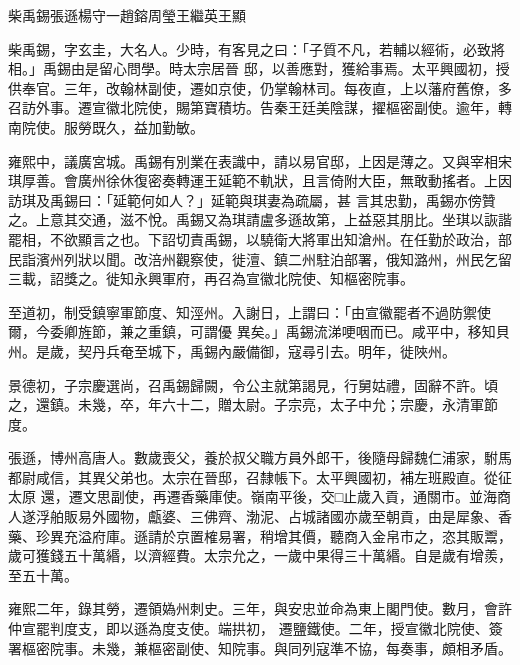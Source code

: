 
\begin{pinyinscope}

 柴禹錫張遜楊守一趙鎔周瑩王繼英王顯



 柴禹錫，字玄圭，大名人。少時，有客見之曰：「子質不凡，若輔以經術，必致將相。」禹錫由是留心問學。時太宗居晉
 邸，以善應對，獲給事焉。太平興國初，授供奉官。三年，改翰林副使，遷如京使，仍掌翰林司。每夜直，上以藩府舊僚，多召訪外事。遷宣徽北院使，賜第寶積坊。告秦王廷美陰謀，擢樞密副使。逾年，轉南院使。服勞既久，益加勤敏。



 雍熙中，議廣宮城。禹錫有別業在表識中，請以易官邸，上因是薄之。又與宰相宋琪厚善。會廣州徐休復密奏轉運王延範不軌狀，且言倚附大臣，無敢動搖者。上因訪琪及禹錫曰：「延範何如人？」延範與琪妻為疏屬，甚
 言其忠勤，禹錫亦傍贊之。上意其交通，滋不悅。禹錫又為琪請盧多遜故第，上益惡其朋比。坐琪以詼諧罷相，不欲顯言之也。下詔切責禹錫，以驍衛大將軍出知滄州。在任勤於政治，部民詣濱州列狀以聞。改涪州觀察使，徙澶、鎮二州駐泊部署，俄知潞州，州民乞留三載，詔獎之。徙知永興軍府，再召為宣徽北院使、知樞密院事。



 至道初，制受鎮寧軍節度、知涇州。入謝日，上謂曰：「由宣徽罷者不過防禦使爾，今委卿旌節，兼之重鎮，可謂優
 異矣。」禹錫流涕哽咽而已。咸平中，移知貝州。是歲，契丹兵奄至城下，禹錫內嚴備御，寇尋引去。明年，徙陜州。



 景德初，子宗慶選尚，召禹錫歸闕，令公主就第謁見，行舅姑禮，固辭不許。頃之，還鎮。未幾，卒，年六十二，贈太尉。子宗亮，太子中允；宗慶，永清軍節度。



 張遜，博州高唐人。數歲喪父，養於叔父職方員外郎干，後隨母歸魏仁浦家，駙馬都尉咸信，其異父弟也。太宗在晉邸，召隸帳下。太平興國初，補左班殿直。從征太原
 還，遷文思副使，再遷香藥庫使。嶺南平後，交□止歲入貢，通關市。並海商人遂浮舶販易外國物，甗婆、三佛齊、渤泥、占城諸國亦歲至朝貢，由是犀象、香藥、珍異充溢府庫。遜請於京置榷易署，稍增其價，聽商入金帛市之，恣其販鬻，歲可獲錢五十萬緡，以濟經費。太宗允之，一歲中果得三十萬緡。自是歲有增羨，至五十萬。



 雍熙二年，錄其勞，遷領媯州刺史。三年，與安忠並命為東上閣門使。數月，會許仲宣罷判度支，即以遜為度支使。端拱初，
 遷鹽鐵使。二年，授宣徽北院使、簽署樞密院事。未幾，兼樞密副使、知院事。與同列寇準不協，每奏事，頗相矛盾。




\end{pinyinscope}
